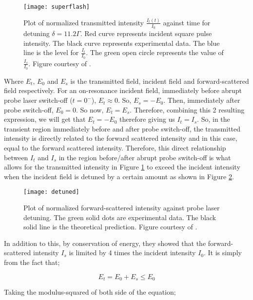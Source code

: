 \begin{figure}[h!]
    \centering
    \texttt{[image: superflash]}
    \caption{Plot of normalized transmitted intensity $\frac{I_{t}(t)}{I_{0}}$ against time for detuning $\delta = 11.2\Gamma$. Red curve represents incident square pulse intensity. The black curve represents experimental data. The blue line is the level for $\frac{I_t}{I_0}$. The green open circle represents the value of $\frac{I_{s}}{I_{0}}$. Figure courtesy of \cite{Kwong2014}.}
    \label{fig: superflash}
\end{figure}

Where $E_{t}$, $E_{0}$ and $E_{s}$ is the transmitted field, incident field and forward-scattered field respectively. For an on-resonance incident field, immediately before abrupt probe laser switch-off ($t = 0^{-}$), $E_{t} \approx 0$. So, $E_{s} = - E_{0}$. Then, immediately after probe switch-off, $E_{0} = 0$. So now, $E_{t} = E_{s}$. Therefore, combining this 2 resulting expression, we will get that $E_{t} = - E_{0}$ therefore giving us $I_{t} = I_{s}$. So, in the transient region immediately before and after probe switch-off, the transmitted intensity is directly related to the forward scattered intensity and in this case, equal to the forward scattered intensity. Therefore, this direct relationship between $I_{t}$ and $I_{s}$ in the region before/after abrupt probe switch-off is what allows for the transmitted intensity in Figure \ref{fig: superflash} to exceed the incident intensity when the incident field is detuned by a certain amount as shown in Figure \ref{fig: detuned}. 

\begin{figure}[h!]
    \centering
    \texttt{[image: detuned]}
    \caption{Plot of normalized forward-scattered intensity against probe laser detuning. The green solid dots are experimental data. The black solid line is the theoretical prediction. Figure courtesy of \cite{Kwong2014}.}
    \label{fig: detuned}
\end{figure}

In addition to this, by conservation of energy, they showed that the forward-scattered intensity $I_{s}$ is limited by 4 times the incident intensity $I_{0}$. It is simply from the fact that;

\begin{equation}
    E_{t} = E_{0} + E_{s} \leq E_{0}
\end{equation}

Taking the modulus-squared of both side of the equation;

